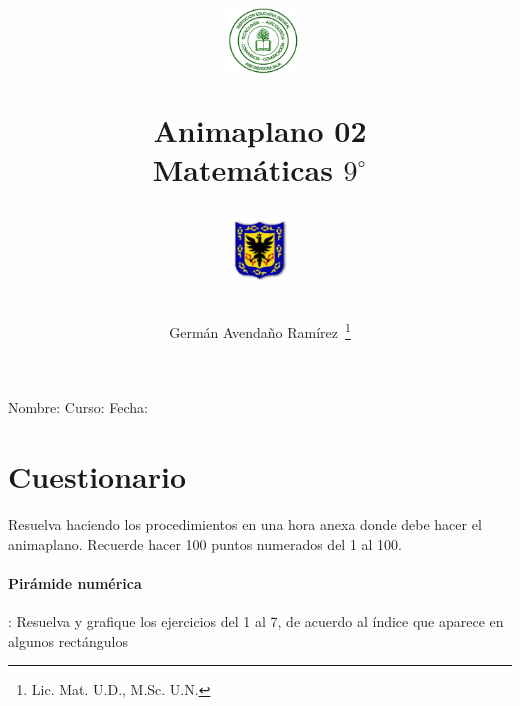 \documentclass[10pt,twoside]{article}
\author{Germ\'an Avenda\~no Ram\'irez~\thanks{Lic. Mat. U.D., M.Sc. U.N.}}
\title{\begin{minipage}{.2\textwidth}
\includegraphics[height=1.75cm]{Images/logo-colegio.png}\end{minipage}
\begin{minipage}{.55\textwidth}
\begin{center}
Animaplano 02\\
Matemáticas $9^{\circ}$
\end{center}
\end{minipage}\hfill
\begin{minipage}{.2\textwidth}
\includegraphics[height=1.75cm]{Images/logo-sed.png} 
\end{minipage}}
\date{}
\begin{document}
\maketitle
Nombre: \hrulefill Curso: \underline{\hspace*{44pt}} Fecha: \underline{\hspace*{2.5cm}}
\section*{Cuestionario}
Resuelva haciendo los procedimientos en una hora anexa donde debe hacer el animaplano. Recuerde hacer 100 puntos numerados del 1 al 100.

\paragraph*{Pirámide numérica}: Resuelva y grafique los ejercicios del 1 al 7, de acuerdo al índice que aparece en algunos rectángulos
\end{document}
